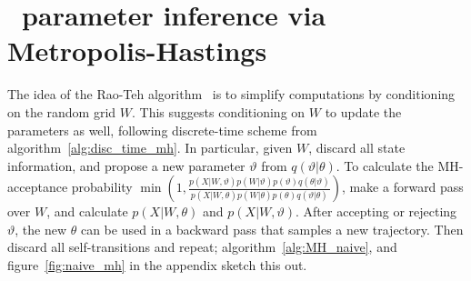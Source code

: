 \section{\Naive\ parameter inference via Metropolis-Hastings}
The idea of the Rao-Teh algorithm~\cite{RaoTeh13} is to simplify
computations by conditioning on the
random grid $W$.
This suggests conditioning on $W$ to update
the parameters as well, following discrete-time scheme from
algorithm~\ref{alg:disc_time_mh}.
In particular, given $W$, discard all state information, and propose a 
new parameter $\vartheta$ from $q(\vartheta|\theta)$. 
To calculate the MH-acceptance probability $\min\left(1,
\frac{p(X|W,\vartheta)p(W|\vartheta)p(\vartheta)q(\theta|\vartheta)}
     {p(X|W,\theta)p(W|\theta)p(\theta)q(\vartheta|\theta)}\right)$, 
make a forward pass over $W$, and calculate 
$p(X|W,\theta)$ and $p(X|W,\vartheta)$. %
After accepting or rejecting $\vartheta$, the new $\theta$ can be used in
a backward pass that samples a new trajectory. Then discard all 
self-transitions and repeat; algorithm~\ref{alg:MH_naive}, and 
figure~\ref{fig:naive_mh} in the appendix sketch this out.
\vspace{-.1in}
